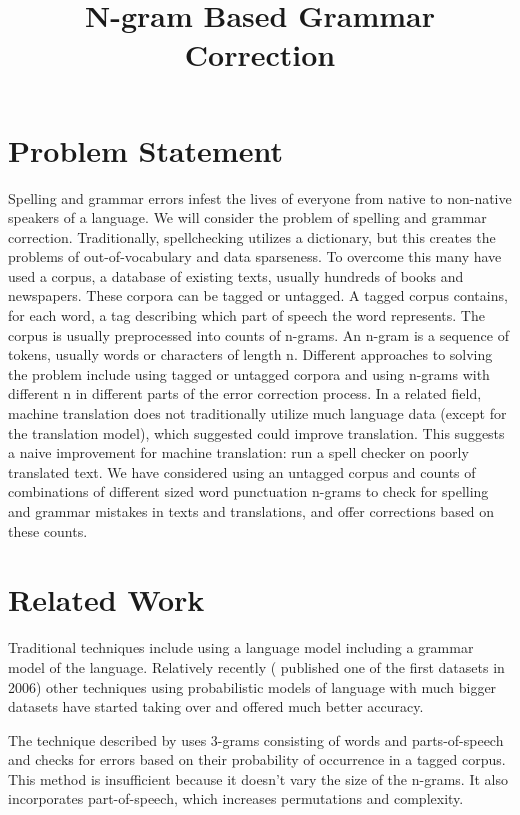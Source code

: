 \documentclass[twocolumn]{article}
\title{N-gram Based Grammar Correction\vspace{-7ex}}
\date{}
\begin{document}
%
%


\maketitle

\section{Problem Statement}
Spelling and grammar errors infest the lives of everyone from native to non-native speakers of a language. We will consider the problem of spelling and grammar correction. Traditionally, spellchecking utilizes a dictionary, but this creates the problems of out-of-vocabulary and data sparseness. To overcome this many have used a corpus, a database of existing texts, usually hundreds of books and newspapers. These corpora can be tagged or untagged. A tagged corpus contains, for each word, a tag describing which part of speech the word represents. The corpus is usually preprocessed into counts of n-grams. An n-gram is a sequence of tokens, usually words or characters of length n. Different approaches to solving the problem include using tagged or untagged corpora and using n-grams with different n in different parts of the error correction process.
In a related field, machine translation does not traditionally utilize much language data (except for the translation model), which \cite{norvig09} suggested could improve translation. This suggests a naive improvement for machine translation: run a spell checker on poorly translated text.
We have considered using an untagged corpus and counts of combinations of different sized word punctuation n-grams to check for spelling and grammar mistakes in texts and translations, and offer corrections based on these counts.\section{Related Work}
Traditional techniques include using a language model including a grammar model of the language. Relatively recently (\cite{michel11} published one of the first datasets in 2006) other techniques using probabilistic models of language with much bigger datasets have started taking over and offered much better accuracy.

The technique described by \cite{Fossati07} uses 3-grams consisting of words and parts-of-speech and checks for errors based on their probability of occurrence in a tagged corpus. This method is insufficient because it doesn’t vary the size of the n-grams. It also incorporates part-of-speech, which increases permutations and complexity.
\end{document}
